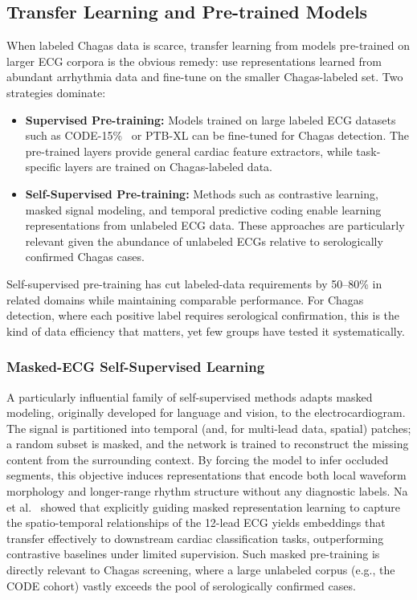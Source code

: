 \subsection{Transfer Learning and Pre-trained Models}

When labeled Chagas data is scarce, transfer learning from models pre-trained on larger ECG corpora is the obvious remedy: use representations learned from abundant arrhythmia data and fine-tune on the smaller Chagas-labeled set. Two strategies dominate:

\begin{itemize}
    \item \textbf{Supervised Pre-training:} Models trained on large labeled ECG datasets such as CODE-15\%~\cite{ribeiro2020automatic} or PTB-XL can be fine-tuned for Chagas detection. The pre-trained layers provide general cardiac feature extractors, while task-specific layers are trained on Chagas-labeled data.

    \item \textbf{Self-Supervised Pre-training:} Methods such as contrastive learning, masked signal modeling, and temporal predictive coding enable learning representations from unlabeled ECG data. These approaches are particularly relevant given the abundance of unlabeled ECGs relative to serologically confirmed Chagas cases.
\end{itemize}

Self-supervised pre-training has cut labeled-data requirements by 50--80\% in related domains while maintaining comparable performance. For Chagas detection, where each positive label requires serological confirmation, this is the kind of data efficiency that matters, yet few groups have tested it systematically.

\subsubsection{Masked-ECG Self-Supervised Learning}

A particularly influential family of self-supervised methods adapts masked modeling, originally developed for language and vision, to the electrocardiogram. The signal is partitioned into temporal (and, for multi-lead data, spatial) patches; a random subset is masked, and the network is trained to reconstruct the missing content from the surrounding context. By forcing the model to infer occluded segments, this objective induces representations that encode both local waveform morphology and longer-range rhythm structure without any diagnostic labels. Na et al.~\cite{na2024guiding} showed that explicitly guiding masked representation learning to capture the spatio-temporal relationships of the 12-lead ECG yields embeddings that transfer effectively to downstream cardiac classification tasks, outperforming contrastive baselines under limited supervision. Such masked pre-training is directly relevant to Chagas screening, where a large unlabeled corpus (e.g., the CODE cohort) vastly exceeds the pool of serologically confirmed cases.

